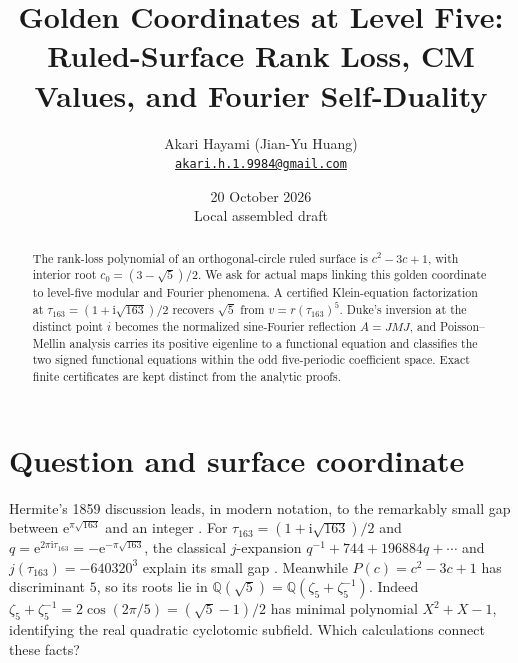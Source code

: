 \documentclass[11pt]{article}
\title{Golden Coordinates at Level Five: Ruled-Surface Rank Loss, CM Values, and Fourier Self-Duality}
\author{Akari Hayami (Jian-Yu Huang)\\{\small\href{mailto:akari.h.1.9984@gmail.com}{\nolinkurl{akari.h.1.9984@gmail.com}}}}\date{20 October 2026\\Local assembled draft}
\newcommand{\Q}{\mathbb Q}\newcommand{\R}{\mathbb R}\newcommand{\ii}{\mathrm i}\newcommand{\e}{\mathrm e}\newcommand{\Fcal}{\mathcal F}\newcommand{\Tcal}{\mathcal T}
\begin{document}
\maketitle
\begin{abstract}
The rank-loss polynomial of an orthogonal-circle ruled surface is $c^2-3c+1$,
with interior root $c_0=(3-\sqrt5)/2$.  We ask for actual maps linking this
golden coordinate to level-five modular and Fourier phenomena.  A certified
Klein-equation factorization at $\tau_{163}=(1+\ii\sqrt{163})/2$ recovers
$\sqrt5$ from $v=r(\tau_{163})^5$.  Duke's inversion at the distinct point
$i$ becomes the normalized sine-Fourier reflection $A=JMJ$, and Poisson--Mellin
analysis carries its positive eigenline to a functional equation and classifies
the two signed functional equations within the odd five-periodic coefficient
space.  Exact
finite certificates are kept distinct from the analytic proofs.
\end{abstract}

\section{Question and surface coordinate}\label{sec:surface}
Hermite's 1859 discussion leads, in modern notation, to the remarkably small
gap between $\e^{\pi\sqrt{163}}$ and an integer \cite[pp.~47--48]{Hermite}.  For
$\tau_{163}=(1+\ii\sqrt{163})/2$ and
$q=\e^{2\pi\ii\tau_{163}}=-\e^{-\pi\sqrt{163}}$, the classical
$j$-expansion $q^{-1}+744+196884q+\cdots$ and
$j(\tau_{163})=-640320^3$ explain its small gap \cite{Duke}.
Meanwhile $P(c)=c^2-3c+1$ has discriminant $5$, so its roots lie in
$\Q(\sqrt5)=\Q(\zeta_5+\zeta_5^{-1})$.
Indeed $\zeta_5+\zeta_5^{-1}=2\cos(2\pi/5)=(\sqrt5-1)/2$ has minimal
polynomial $X^2+X-1$, identifying the real quadratic cyclotomic subfield.  Which calculations connect these
facts?
\end{document}
